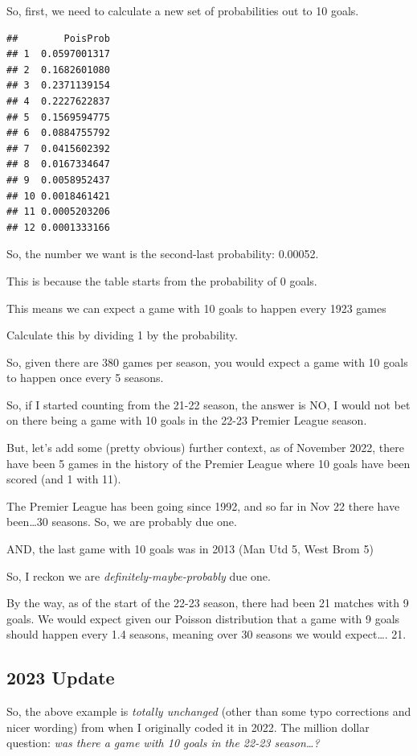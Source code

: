 \documentclass[
]{book}
\begin{document}
So, first, we need to calculate a new set of probabilities out to 10 goals.

\begin{verbatim}
##        PoisProb
## 1  0.0597001317
## 2  0.1682601080
## 3  0.2371139154
## 4  0.2227622837
## 5  0.1569594775
## 6  0.0884755792
## 7  0.0415602392
## 8  0.0167334647
## 9  0.0058952437
## 10 0.0018461421
## 11 0.0005203206
## 12 0.0001333166
\end{verbatim}

So, the number we want is the second-last probability: 0.00052.

This is because the table starts from the probability of 0 goals.

This means we can expect a game with 10 goals to happen every 1923 games

Calculate this by dividing 1 by the probability.

So, given there are 380 games per season, you would expect a game with 10 goals to happen once every 5 seasons.

So, if I started counting from the 21-22 season, the answer is NO, I would not bet on there being a game with 10 goals in the 22-23 Premier League season.

But, let's add some (pretty obvious) further context, as of November 2022, there have been 5 games in the history of the Premier League where 10 goals have been scored (and 1 with 11).

The Premier League has been going since 1992, and so far in Nov 22 there have been\ldots30 seasons. So, we are probably due one.

AND, the last game with 10 goals was in 2013 (Man Utd 5, West Brom 5)

So, I reckon we are \emph{definitely-maybe-probably} due one.

By the way, as of the start of the 22-23 season, there had been 21 matches with 9 goals. We would expect given our Poisson distribution that a game with 9 goals should happen every 1.4 seasons, meaning over 30 seasons we would expect\ldots. 21.

\subsection{2023 Update}\label{update}

So, the above example is \emph{totally unchanged} (other than some typo corrections and nicer wording) from when I originally coded it in 2022. The million dollar question: \emph{was there a game with 10 goals in the 22-23 season\ldots?}
\end{document}
